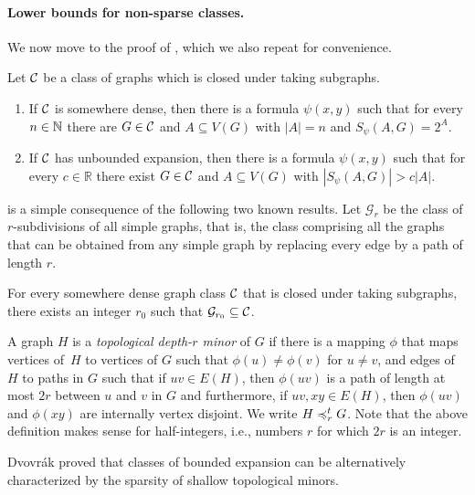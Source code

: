 \paragraph*{Lower bounds for non-sparse classes.}
We now move to the proof of , which we also repeat for
convenience.

\begin{theorem}
Let $\mathcal{C}$ be a class of graphs which 
is closed under taking subgraphs. 
\begin{enumerate}[(1)]
\item If $\mathcal{C}$ is somewhere dense, then there is a formula 
$\psi(x,y)$ such that for every $n\in \mathbb{N}$ there are $G\in\mathcal{C}$ and $A\subseteq V(G)$ 
with $|A|=n$ and $S_\psi(A,G)=2^{A}$. 
\item If $\mathcal{C}$ has unbounded expansion, then there is a formula 
$\psi(x,y)$ such that for every $c\in \mathbb{R}$ there exist $G\in\mathcal{C}$ and $A\subseteq V(G)$ with $|S_\psi(A,G)|>c|A|$. 
\end{enumerate}
\end{theorem}

 is a simple consequence of the following two
known results. 
Let $\mathcal{G}_r$ be the class of $r$-subdivisions of all 
simple graphs, that is, the class comprising
all the graphs that can be obtained from any simple graph by replacing every edge by a path of
length $r$.

\begin{lemma}\label{lem:lower-nd}
For every somewhere dense graph class $\mathcal{C}$ that is closed 
under taking subgraphs, there
exists an integer $r_0$ such that $\mathcal{G}_{r_0}\subseteq \mathcal{C}$.
\end{lemma}

A graph $H$ is a \emph{topological depth-$r$ minor} of $G$ if
there is a mapping $\phi$ that maps vertices of~$H$ to 
vertices of $G$ such that $\phi(u)\neq \phi(v)$ for 
$u\neq v$, and edges of $H$ to paths in 
$G$ such that if $uv\in E(H)$, then $\phi(uv)$
is a path of length at most $2r$ between $u$ and $v$ in 
$G$ and furthermore, if $uv, xy\in E(H)$, then 
$\phi(uv)$ and $\phi(xy)$ are internally vertex
disjoint. We write $H\preccurlyeq_r^t G$. 
Note that the above definition makes sense for 
half-integers, i.e., numbers $r$ for which $2r$ is an integer.

Dvov{r}\'ak proved that classes of bounded expansion can be alternatively characterized by the sparsity of shallow topological minors.

